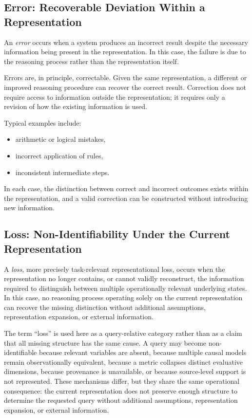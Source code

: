 \documentclass[11pt]{article}
\begin{document}
\subsection{Error: Recoverable Deviation Within a Representation}

An \emph{error} occurs when a system produces an incorrect result despite the necessary information being present in the representation. In this case, the failure is due to the reasoning process rather than the representation itself.

Errors are, in principle, correctable. Given the same representation, a different or improved reasoning procedure can recover the correct result. Correction does not require access to information outside the representation; it requires only a revision of how the existing information is used.

Typical examples include:
\begin{itemize}[leftmargin=1.5em]
    \item arithmetic or logical mistakes,
    \item incorrect application of rules,
    \item inconsistent intermediate steps.
\end{itemize}

In each case, the distinction between correct and incorrect outcomes exists within the representation, and a valid correction can be constructed without introducing new information.

\subsection{Loss: Non-Identifiability Under the Current Representation}

A \emph{loss}, more precisely task-relevant representational loss, occurs when the representation no longer contains, or cannot validly reconstruct, the information required to distinguish between multiple operationally relevant underlying states. In this case, no reasoning process operating solely on the current representation can recover the missing distinction without additional assumptions, representation expansion, or external information.

The term ``loss'' is used here as a query-relative category rather than as a claim that all missing structure has the same cause. A query may become non-identifiable because relevant variables are absent, because multiple causal models remain observationally equivalent, because a metric collapses distinct evaluative dimensions, because provenance is unavailable, or because source-level support is not represented. These mechanisms differ, but they share the same operational consequence: the current representation does not preserve enough structure to determine the requested query without additional assumptions, representation expansion, or external information.
\end{document}
